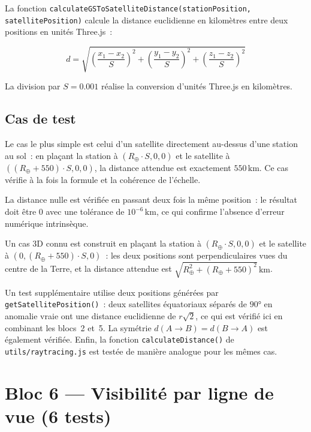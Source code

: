 \documentclass[12pt,a4paper]{article}
\begin{document}
La fonction \texttt{calculateGSToSatelliteDistance(stationPosition, satellitePosition)} calcule la distance euclidienne en kilomètres entre deux positions en unités Three.js~:

\begin{equation}
    d = \sqrt{\left(\frac{x_1 - x_2}{S}\right)^2 + \left(\frac{y_1 - y_2}{S}\right)^2 + \left(\frac{z_1 - z_2}{S}\right)^2}
\end{equation}

La division par $S = 0.001$ réalise la conversion d'unités Three.js en kilomètres.

\subsection{Cas de test}

Le cas le plus simple est celui d'un satellite directement au-dessus d'une station au sol~: en plaçant la station à $(R_\oplus \cdot S, 0, 0)$ et le satellite à $((R_\oplus + 550) \cdot S, 0, 0)$, la distance attendue est exactement $550\,\text{km}$. Ce cas vérifie à la fois la formule et la cohérence de l'échelle.

La distance nulle est vérifiée en passant deux fois la même position~: le résultat doit être $0$ avec une tolérance de $10^{-6}\,\text{km}$, ce qui confirme l'absence d'erreur numérique intrinsèque.

Un cas 3D connu est construit en plaçant la station à $(R_\oplus \cdot S, 0, 0)$ et le satellite à $(0, (R_\oplus + 550) \cdot S, 0)$~: les deux positions sont perpendiculaires vues du centre de la Terre, et la distance attendue est $\sqrt{R_\oplus^2 + (R_\oplus + 550)^2}\,\text{km}$.

Un test supplémentaire utilise deux positions générées par \texttt{getSatellitePosition()}~: deux satellites équatoriaux séparés de $90°$ en anomalie vraie ont une distance euclidienne de $r\sqrt{2}$, ce qui est vérifié ici en combinant les blocs~2 et~5. La symétrie $d(A \to B) = d(B \to A)$ est également vérifiée. Enfin, la fonction \texttt{calculateDistance()} de \texttt{utils/raytracing.js} est testée de manière analogue pour les mêmes cas.

\section{Bloc 6 — Visibilité par ligne de vue (6 tests)}
\end{document}
